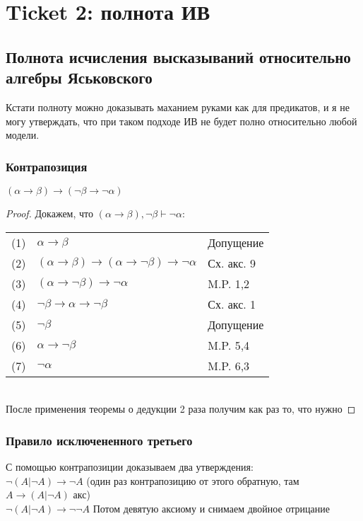 \section{Ticket 2: полнота ИВ}
\label{sec-4}
\subsection{Полнота исчисления высказываний относительно алгебры Яськовского}
\label{sec-4-1}
Кстати полноту можно доказывать маханием руками как для предикатов,
и я не могу утверждать, что при таком подходе ИВ не будет полно
относительно любой модели.
\subsubsection{Контрапозиция}
\label{sec-4-1-1}
\begin{lemma}
$(\alpha \to \beta) \to (\lnot \beta \to \lnot \alpha)$\\
\end{lemma}
\begin{proof}
Докажем, что $(\alpha \to \beta), \lnot \beta \vdash \lnot \alpha$:\\
\begin{tabular}{lll}
(1) & $\alpha \to \beta$& Допущение\\
(2) & $(\alpha \to \beta) \to (\alpha \to \lnot \beta) \to \lnot \alpha$& Сх. акс. 9\\
(3) & $(\alpha \to \lnot \beta) \to \lnot \alpha$& M.P. 1,2\\
(4) & $\lnot \beta \to \alpha \to \lnot \beta$& Сх. акс. 1\\
(5) & $\lnot \beta$& Допущение\\
(6) & $\alpha \to \lnot \beta$& M.P. 5,4\\
(7) & $\lnot \alpha$& M.P. 6,3\\
\end{tabular}\\
После применения теоремы о дедукции 2 раза получим как раз то, что нужно
\end{proof}
\subsubsection{Правило исключененного третьего}
\label{sec-4-1-2}
С помощью контрапозиции доказываем два утверждения:\\
$\lnot (A|\lnot A)\to \lnot A$ (один раз контрапозицию от этого обратную, там $A\to (A|\lnot A)$ акс) \\
$\lnot (A|\lnot A)\to \lnot \lnot A$
Потом девятую аксиому и снимаем двойное отрицание
